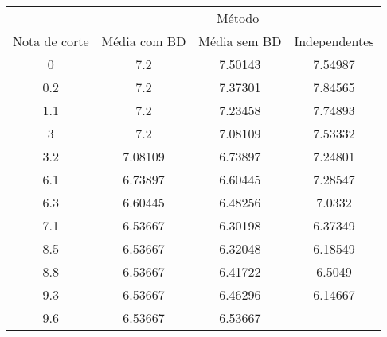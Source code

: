 \begin{tabular}{c ccc}
        \hline
                      & \multicolumn{3}{c}{Método} \\ \cline{2-4}
        Nota de corte & Média com BD & Média sem BD & Independentes \\
        \hline
        0    & 7.2 & 7.50143  & 7.54987     \\
        0.2  & 7.2 & 7.37301  & 7.84565     \\
        1.1  & 7.2 & 7.23458 & 7.74893      \\
        3    & 7.2 & 7.08109 & 7.53332      \\
        3.2  & 7.08109 & 6.73897 & 7.24801  \\
        6.1  & 6.73897 & 6.60445 & 7.28547  \\
        6.3  & 6.60445 & 6.48256 & 7.0332   \\
        7.1  & 6.53667 & 6.30198 & 6.37349  \\
        8.5  & 6.53667 & 6.32048 & 6.18549  \\
        8.8  & 6.53667 & 6.41722 & 6.5049   \\
        9.3  & 6.53667 & 6.46296 & 6.14667  \\
        9.6  & 6.53667 & 6.53667 &          \\
        \hline
\end{tabular}
